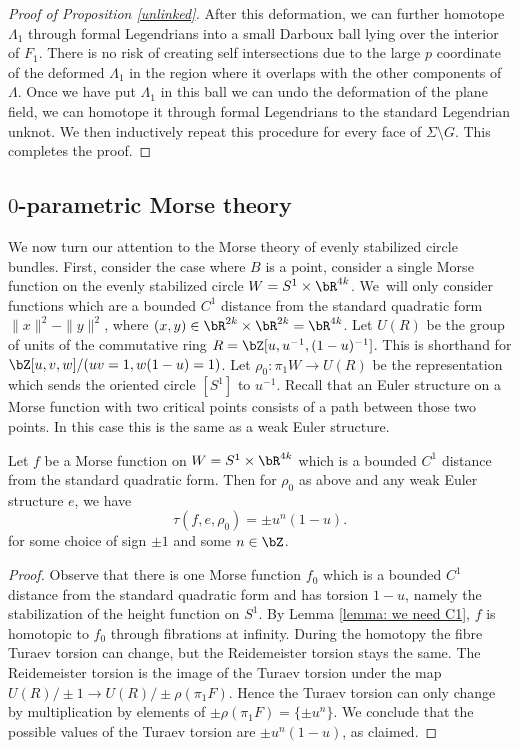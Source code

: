 \begin{proof}[Proof of Proposition \ref{unlinked}]
After this deformation, we can further homotope $\Lambda_1$ through formal Legendrians into a small Darboux ball lying over the interior of $F_1$. There is no risk of creating self intersections due to the large $p$ coordinate of the deformed $\Lambda_1$ in the region where it overlaps with the other components of $\Lambda$. Once we have put $\Lambda_1$ in this ball we can undo the deformation of the plane field, \ie we can homotope it through formal Legendrians to the standard Legendrian unknot. We then inductively repeat this procedure for every face of $\Sigma \setminus G$. This completes the proof. \end{proof}

\subsection{$0$-parametric Morse theory}

We now turn our attention to the Morse theory of evenly stabilized circle bundles. First, consider the case where $B$ is a point, \ie consider a single Morse function on the evenly stabilized circle $W=S^1\times \bR^{4k}$. We~will only consider functions which are a bounded $C^1$ distance from the standard quadratic form $\|x\|^2-\|y\|^2$, where $(x,y) \in \bR^{2k} \times \bR^{2k}=\bR^{4k}$. Let $U(R)$ be the group of units of the commutative ring $R=\bZ[u,u^{-1},(1-u)^{-1}]$. This is shorthand for \hbox{$\bZ[u,v,w]/(uv=1,w(1-u)=1)$}. Let $\rho_0:\pi_1W \to U(R)$ be the representation which sends the oriented circle $[S^1]$ to $u^{-1}$. Recall that an Euler structure on a Morse function with two critical points consists of a path between those two points. In this case this is the same as a weak Euler structure.

\begin{lemma}\label{Lemma 0}
Let $f$ be a Morse function on $W=S^1\times \bR^{4k}$ which is a bounded $C^1$ distance from the standard quadratic form. Then for $\rho_0$ as above and any weak Euler structure $e$, we have
\[
\tau(f,e,\rho_0)=\pm u^n(1-u).
\]
for some choice of sign $\pm1$ and some $n \in \bZ$.
\end{lemma}

\begin{proof}
Observe that there is one Morse function $f_0$ which is a bounded $C^1$ distance from the standard quadratic form and has torsion $1-u$, namely the stabilization of the height function on $S^1$. By Lemma \ref{lemma: we need C1}, $f$ is homotopic to $f_0$ through fibrations at infinity. During the homotopy the fibre Turaev torsion can change, but the Reidemeister torsion stays the same. The Reidemeister torsion is the image of the Turaev torsion under the map $U(R) / \pm 1 \to U(R)/\pm \rho(\pi_1F)$. Hence the Turaev torsion can only change by multiplication by elements of $\pm \rho(\pi_1F)=\{\pm u^n\}$. We conclude that the possible values of the Turaev torsion are $\pm u^n(1-u)$, as claimed.
\end{proof}

